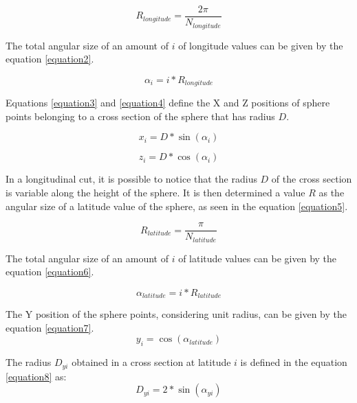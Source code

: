 \documentclass[runningheads]{llncs}
\begin{document}
\begin{equation}
R_{longitude} = \frac{2 \pi}{N_{longitude}}
\label{equation1}
\end{equation}

The total angular size of an amount of $i$ of longitude values can be given by the equation \ref{equation2}.

\begin{equation}
\alpha_{i} = i * R_{longitude}
\label{equation2}
\end{equation}

Equations \ref{equation3} and \ref{equation4} define the X and Z positions of sphere points belonging to a cross section of the sphere that has radius $D$.

\begin{equation}
x_{i} = D * \sin(\alpha_{i})
\label{equation3}
\end{equation}

\begin{equation}
z_{i} = D * \cos(\alpha_{i})
\label{equation4}
\end{equation}

In a longitudinal cut, it is possible to notice that the radius $D$ of the cross section is variable along the height of the sphere. It is then determined a value $R$ as the angular size of a latitude value of the sphere, as seen in the equation \ref{equation5}.

\begin{equation}
R_{latitude} = \frac{\pi}{ N_{latitude}}
\label{equation5}
\end{equation}

The total angular size of an amount of $i$ of latitude values can be given by the equation \ref{equation6}.

\begin{equation}
\alpha_{latitude} = i * R_{latitude}
\label{equation6}
\end{equation}

The Y position of the sphere points, considering unit radius, can be given by the equation \ref{equation7}.
\begin{equation}
y_{i} = \cos(\alpha_{latitude})
\label{equation7}
\end{equation}

The radius $D_{yi}$ obtained in a cross section at latitude $i$ is defined in the equation \ref{equation8} as:
\begin{equation}
D_{yi} = 2 * \sin(\alpha_{yi})
\label{equation8}
\end{equation}
\end{document}
